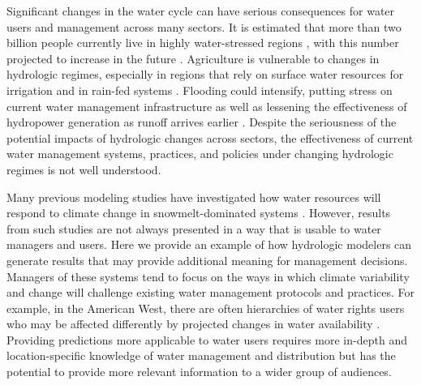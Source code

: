 \documentclass[11pt,letterpaper]{article}
\begin{document}
Significant changes in the water cycle can have serious consequences for water users and management across many sectors. It is estimated that more than two billion people currently live in highly water-stressed regions \citep{Oki:2006cu}, with this number projected to increase in the future \citep{Schewe:2014er}. Agriculture is vulnerable to changes in hydrologic regimes, especially in regions that rely on surface water resources for irrigation and in rain-fed systems \citep{Turral:2011uj}. Flooding could intensify, putting stress on current water management infrastructure as well as lessening the effectiveness of hydropower generation as runoff arrives earlier \citep{Markoff:2008tk}. Despite the seriousness of the potential impacts of hydrologic changes across sectors, the effectiveness of current water management systems, practices, and policies under changing hydrologic regimes is not well understood.

Many previous modeling studies have investigated how water resources will respond to climate change in snowmelt-dominated systems \citep{Adam:2009ie, Jin:2011ii, Ficklin:2013js, Gergel:2017vj}. However, results from such studies are not always presented in a way that is usable to water managers and users. Here we provide an example of how hydrologic modelers can generate results that may provide additional meaning for management decisions. Managers of these systems tend to focus on the ways in which climate variability and change will challenge existing water management protocols and practices. For example, in the American West, there are often hierarchies of water rights users who may be affected differently by projected changes in water availability \citep{Vicuna:2007gj}. Providing predictions more applicable to water users requires more in-depth and location-specific knowledge of water management and distribution but has the potential to provide more relevant information to a wider group of audiences. 
\end{document}

